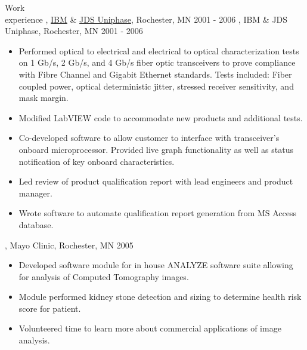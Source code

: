 \begin{category}{Work \\experience}
\ifWebLinks
{}, \href{http://www.ibm.com}{IBM} \& \href{http://www.jdsu.com}{JDS Uniphase}, Rochester, MN  2001 - 2006 
\else
{}, IBM \& JDS Uniphase, Rochester, MN  2001 - 2006 
\fi

\begin{itemize}
\item Performed optical to electrical and electrical to optical characterization tests on 1 Gb/s, 2 Gb/s, and 4 Gb/s fiber optic transceivers to prove compliance with Fibre Channel and Gigabit Ethernet standards. Tests included: Fiber coupled power, optical deterministic jitter, stressed receiver sensitivity, and mask margin.
\item Modified LabVIEW code to accommodate new products and additional tests.
\item Co-developed software to allow customer to interface with transceiver's onboard microprocessor. Provided live graph functionality as well as status notification of key onboard characteristics.
\item Led review of product qualification report with lead engineers and product manager.
\item Wrote software to automate qualification report generation from MS Access database.
\end{itemize}


\ifHideOlderInfo

, Mayo Clinic, Rochester, MN  2005 
\begin{itemize}
\item Developed software module for in house ANALYZE software suite allowing for analysis of Computed Tomography images. 
\item Module performed kidney stone detection and sizing to determine health risk score for patient.
\item Volunteered time to learn more about commercial applications of image analysis. 
\end{itemize}



\end{category}
